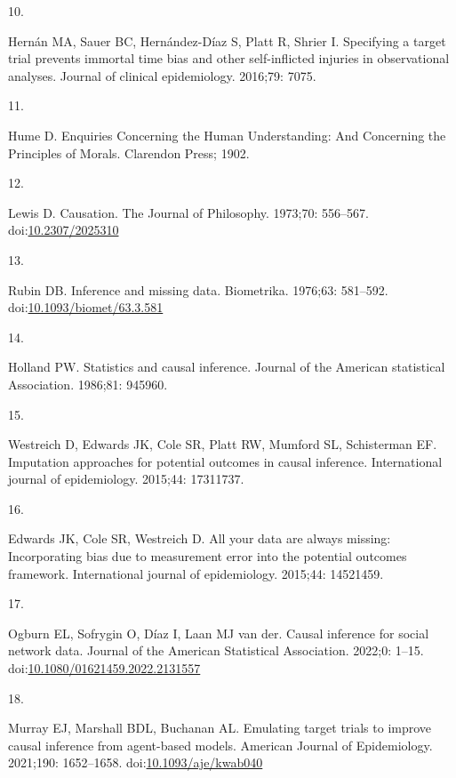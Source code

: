 \documentclass[
  singlecolumn]{article}
\newlength{\cslhangindent}
\newlength{\csllabelwidth}
\newlength{\cslentryspacingunit} %
\newenvironment{CSLReferences}[2] %
 {%
  \setlength{\parindent}{0pt}
  \ifodd #1
  \let\oldpar\par
  \def\par{\hangindent=\cslhangindent\oldpar}
  \fi
  \setlength{\parskip}{#2\cslentryspacingunit}
 }%
 {}
\newcommand{\CSLLeftMargin}[1]{\parbox[t]{\csllabelwidth}{#1}}
\newcommand{\CSLRightInline}[1]{\parbox[t]{\linewidth - \csllabelwidth}{#1}\break}
\begin{document}
\begin{CSLReferences}{0}{0}
\leavevmode{}%
\CSLLeftMargin{10. }%
\CSLRightInline{Hernán MA, Sauer BC, Hernández-Díaz S, Platt R, Shrier
I. Specifying a target trial prevents immortal time bias and other
self-inflicted injuries in observational analyses. Journal of clinical
epidemiology. 2016;79: 7075. }

\leavevmode{}%
\CSLLeftMargin{11. }%
\CSLRightInline{Hume D. Enquiries Concerning the Human Understanding:
And Concerning the Principles of Morals. Clarendon Press; 1902. }

\leavevmode{}%
\CSLLeftMargin{12. }%
\CSLRightInline{Lewis D. Causation. The Journal of Philosophy. 1973;70:
556--567. doi:\href{https://doi.org/10.2307/2025310}{10.2307/2025310}}

\leavevmode{}%
\CSLLeftMargin{13. }%
\CSLRightInline{Rubin DB. Inference and missing data. Biometrika.
1976;63: 581--592.
doi:\href{https://doi.org/10.1093/biomet/63.3.581}{10.1093/biomet/63.3.581}}

\leavevmode{}%
\CSLLeftMargin{14. }%
\CSLRightInline{Holland PW. Statistics and causal inference. Journal of
the American statistical Association. 1986;81: 945960. }

\leavevmode{}%
\CSLLeftMargin{15. }%
\CSLRightInline{Westreich D, Edwards JK, Cole SR, Platt RW, Mumford SL,
Schisterman EF. Imputation approaches for potential outcomes in causal
inference. International journal of epidemiology. 2015;44: 17311737. }

\leavevmode{}%
\CSLLeftMargin{16. }%
\CSLRightInline{Edwards JK, Cole SR, Westreich D. All your data are
always missing: Incorporating bias due to measurement error into the
potential outcomes framework. International journal of epidemiology.
2015;44: 14521459. }

\leavevmode{}%
\CSLLeftMargin{17. }%
\CSLRightInline{Ogburn EL, Sofrygin O, Díaz I, Laan MJ van der. Causal
inference for social network data. Journal of the American Statistical
Association. 2022;0: 1--15.
doi:\href{https://doi.org/10.1080/01621459.2022.2131557}{10.1080/01621459.2022.2131557}}

\leavevmode{}%
\CSLLeftMargin{18. }%
\CSLRightInline{Murray EJ, Marshall BDL, Buchanan AL. Emulating target
trials to improve causal inference from agent-based models. American
Journal of Epidemiology. 2021;190: 1652--1658.
doi:\href{https://doi.org/10.1093/aje/kwab040}{10.1093/aje/kwab040}}


\end{CSLReferences}
\end{document}
